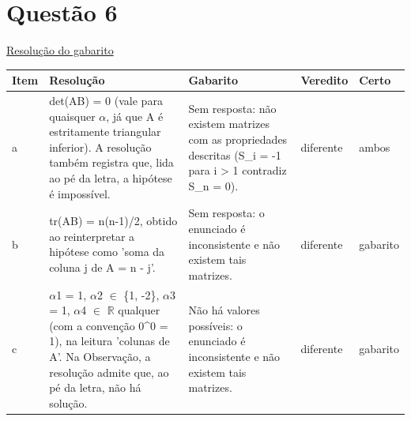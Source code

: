 \documentclass{article}%
\begin{document}
\section*{Questão 6}%
\href{https://poliedroresolve.sistemapoliedro.com.br/vestibulares/ita/2026/ita-2-fase-dia-1-28-10-2025-2-fase-dia-1/dissertativa-6-matematica-2-fase-dia-1-ita-2026}{Resolução do gabarito}\par\smallskip%
\begin{longtable}{@{}p{} p{} p{} p{} p{}@{}}\toprule Item & Resolução & Gabarito & Veredito & Certo \\ \midrule
a & det(AB) = 0 (vale para quaisquer $\alpha$, já que A é estritamente triangular inferior). A resolução também registra que, lida ao pé da letra, a hipótese é impossível. & Sem resposta: não existem matrizes com as propriedades descritas (S\_i = -1 para i > 1 contradiz S\_n = 0). & diferente & ambos \\
b & tr(AB) = n(n-1)/2, obtido ao reinterpretar a hipótese como 'soma da coluna j de A = n - j'. & Sem resposta: o enunciado é inconsistente e não existem tais matrizes. & diferente & gabarito \\
c & $\alpha$1 = 1, $\alpha$2 $\in$ \{1, -2\}, $\alpha$3 = 1, $\alpha$4 $\in$ $\mathbb{R}$ qualquer (com a convenção 0\^{}0 = 1), na leitura 'colunas de A'. Na Observação, a resolução admite que, ao pé da letra, não há solução. & Não há valores possíveis: o enunciado é inconsistente e não existem tais matrizes. & diferente & gabarito \\
\bottomrule\end{longtable}%
\end{document}
